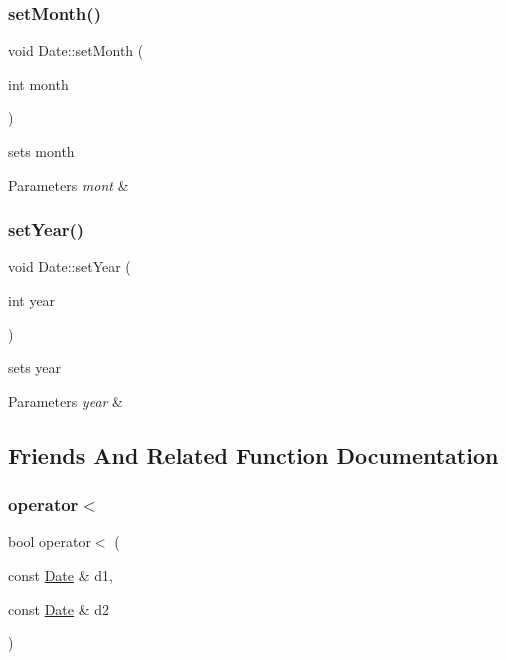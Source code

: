 \subsubsection{\texorpdfstring{set\+Month()}{setMonth()}}
{\footnotesize\ttfamily void Date\+::set\+Month (\begin{DoxyParamCaption}\item[{int}]{month }\end{DoxyParamCaption})}



sets month 


\begin{DoxyParams}{Parameters}
{\em mont} & \\
\hline
\end{DoxyParams}
\hypertarget{class_date_a895c4ae9868e43577cf59d9c679d7a71}{}\label{class_date_a895c4ae9868e43577cf59d9c679d7a71} 
\subsubsection{\texorpdfstring{set\+Year()}{setYear()}}
{\footnotesize\ttfamily void Date\+::set\+Year (\begin{DoxyParamCaption}\item[{int}]{year }\end{DoxyParamCaption})}



sets year 


\begin{DoxyParams}{Parameters}
{\em year} & \\
\hline
\end{DoxyParams}


\subsection{Friends And Related Function Documentation}
\hypertarget{class_date_a5a3f411cbd59e9ecb90b2f8e6aaea551}{}\label{class_date_a5a3f411cbd59e9ecb90b2f8e6aaea551} 
\subsubsection{\texorpdfstring{operator$<$}{operator<}}
{\footnotesize\ttfamily bool operator$<$ (\begin{DoxyParamCaption}\item[{const \hyperlink{class_date}{Date} \&}]{d1,  }\item[{const \hyperlink{class_date}{Date} \&}]{d2 }\end{DoxyParamCaption})\hspace{0.3cm}{\ttfamily [friend]}}



